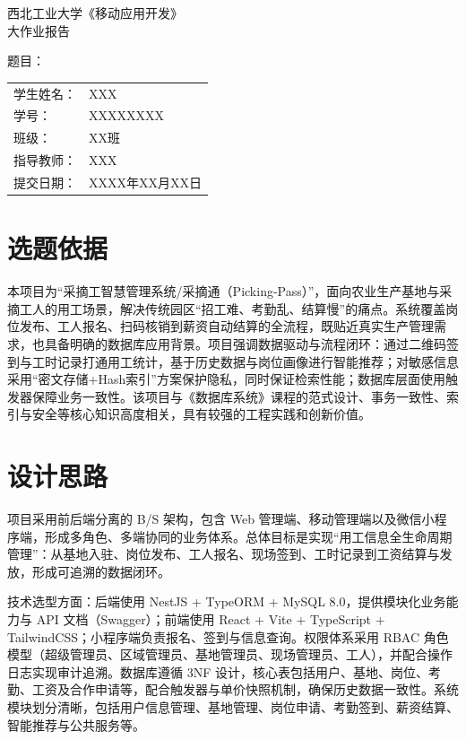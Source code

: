 \documentclass[UTF8,a4paper,fontset=none]{ctexart}
\newcommand{\songti}{\CJKfamily{zhsong}}
\newcommand{\heiti}{\CJKfamily{zhhei}}
\begin{document}
\songti{}

\begin{titlepage}
\thispagestyle{empty}

\begin{center}
  \vspace*{2cm}
  {\heiti{} 西北工业大学《移动应用开发》}\\[1.5em]
  {\heiti{} 大作业报告}
\end{center}

\vspace{5cm}

\noindent
题目：

\vspace{2cm}

\noindent
\begin{tabular}{@{}ll}
学生姓名：& XXX\\
学号：& XXXXXXXX\\
班级：& XX班\\
指导教师：& XXX\\
提交日期：& XXXX年XX月XX日
\end{tabular}
\end{titlepage}

\section{选题依据}
本项目为“采摘工智慧管理系统/采摘通（Picking-Pass）”，面向农业生产基地与采摘工人的用工场景，解决传统园区“招工难、考勤乱、结算慢”的痛点。系统覆盖岗位发布、工人报名、扫码核销到薪资自动结算的全流程，既贴近真实生产管理需求，也具备明确的数据库应用背景。项目强调数据驱动与流程闭环：通过二维码签到与工时记录打通用工统计，基于历史数据与岗位画像进行智能推荐；对敏感信息采用“密文存储+Hash索引”方案保护隐私，同时保证检索性能；数据库层面使用触发器保障业务一致性。该项目与《数据库系统》课程的范式设计、事务一致性、索引与安全等核心知识高度相关，具有较强的工程实践和创新价值。

\section{设计思路}
项目采用前后端分离的 B/S 架构，包含 Web 管理端、移动管理端以及微信小程序端，形成多角色、多端协同的业务体系。总体目标是实现“用工信息全生命周期管理”：从基地入驻、岗位发布、工人报名、现场签到、工时记录到工资结算与发放，形成可追溯的数据闭环。

技术选型方面：后端使用 NestJS + TypeORM + MySQL 8.0，提供模块化业务能力与 API 文档（Swagger）；前端使用 React + Vite + TypeScript + TailwindCSS；小程序端负责报名、签到与信息查询。权限体系采用 RBAC 角色模型（超级管理员、区域管理员、基地管理员、现场管理员、工人），并配合操作日志实现审计追溯。数据库遵循 3NF 设计，核心表包括用户、基地、岗位、考勤、工资及合作申请等，配合触发器与单价快照机制，确保历史数据一致性。系统模块划分清晰，包括用户信息管理、基地管理、岗位申请、考勤签到、薪资结算、智能推荐与公共服务等。
\end{document}
